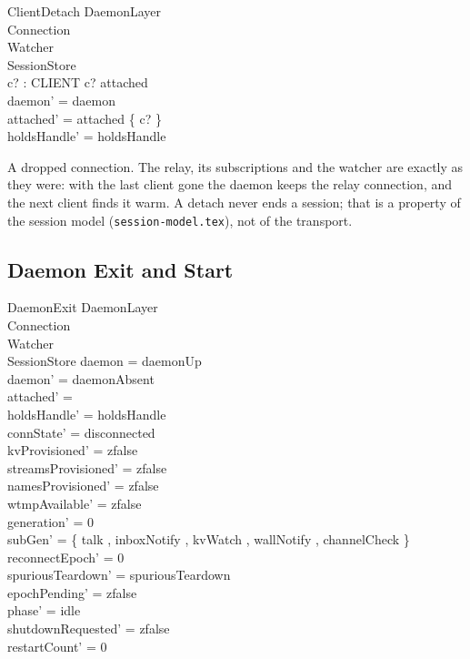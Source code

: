 \documentclass[a4paper,10pt,fleqn]{article}
\begin{document}
\begin{schema}{ClientDetach}
  \Delta DaemonLayer \\
  \Xi Connection \\
  \Xi Watcher \\
  \Xi SessionStore \\
  c? : CLIENT
  \where
  c? \in attached \\
  daemon' = daemon \\
  attached' = attached \setminus \{ c? \} \\
  holdsHandle' = holdsHandle
\end{schema}

A dropped connection.  The relay, its subscriptions and the watcher are
exactly as they were: with the last client gone the daemon keeps the relay
connection, and the next client finds it warm.  A detach never ends a
session; that is a property of the session model
(\texttt{session-model.tex}), not of the transport.

\subsection{Daemon Exit and Start}

\begin{schema}{DaemonExit}
  \Delta DaemonLayer \\
  \Delta Connection \\
  \Delta Watcher \\
  \Xi SessionStore
  \where
  daemon = daemonUp \\
  daemon' = daemonAbsent \\
  attached' = \emptyset \\
  holdsHandle' = holdsHandle \\
  connState' = disconnected \\
  kvProvisioned' = zfalse \\
  streamsProvisioned' = zfalse \\
  namesProvisioned' = zfalse \\
  wtmpAvailable' = zfalse \\
  generation' = 0 \\
  subGen' = \{ talk , inboxNotify , kvWatch ,
    wallNotify , channelCheck  \} \\
  reconnectEpoch' = 0 \\
  spuriousTeardown' = spuriousTeardown \\
  epochPending' = zfalse \\
  phase' = idle \\
  shutdownRequested' = zfalse \\
  restartCount' = 0
\end{schema}
\end{document}

